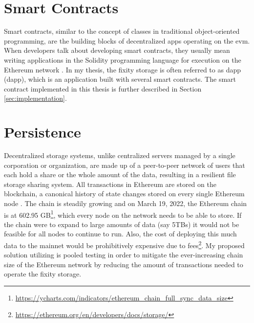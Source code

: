 \section{Smart Contracts}
Smart contracts, similar to the concept of classes in traditional object-oriented programming, are the building blocks of decentralized apps operating on the \acrshort{evm}. When developers talk about developing smart contracts, they usually mean writing applications in the Solidity programming language for execution on the Ethereum network \cite[10]{dannen2017introducing}.
In my thesis, the fixity storage is often referred to as \acrlong{dapp} (\acrshort{dapp}), which is an application built with several smart contracts. The smart contract implemented in this thesis is further described in Section \ref{sec:implementation}. 

\section{Persistence}\label{sec:persistence}
Decentralized storage systems, unlike centralized servers managed by a single corporation or organization, are made up of a peer-to-peer network of users that each hold a share or the whole amount of the data, resulting in a resilient file storage sharing system. All transactions in Ethereum are stored on the blockchain, a canonical history of state changes stored on every single Ethereum node \cite[12]{dannen2017introducing}. 
The chain is steadily growing and on March 19, 2022, the Ethereum chain is at 602.95 GB\footnote{\url{https://ycharts.com/indicators/ethereum_chain_full_sync_data_size}}, which every node on the network needs to be able to store. If the chain were to expand to large amounts of data (say 5TBs) it would not be feasible for all nodes to continue to run. Also, the cost of deploying this much data to the mainnet would be prohibitively expensive due to fees\footnote{\url{https://ethereum.org/en/developers/docs/storage/}}.
My proposed solution utilizing is pooled testing in order to mitigate the ever-increasing chain size of the Ethereum network by reducing the amount of transactions needed to operate the fixity storage. 

